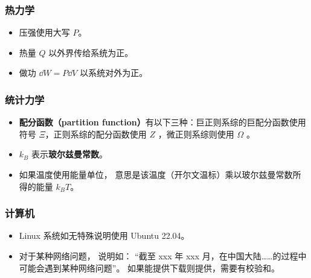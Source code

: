 \subsubsection{热力学}
\begin{itemize}
\item 压强使用大写 $P$。
\item 热量 $Q$ 以外界传给系统为正。
\item 做功 $\dd{W} = P\dd{V}$ 以系统对外为正。
\end{itemize}

\subsubsection{统计力学}
\begin{itemize}
\item \textbf{配分函数（partition function）}有以下三种：巨正则系综的巨配分函数使用符号 $\Xi$，正则系综的配分函数使用 $Z$ ，微正则系综则使用 $\Omega$ 。
\item $k_B$ 表示\textbf{玻尔兹曼常数}。%
\item 如果温度使用能量单位， 意思是该温度（开尔文温标）乘以玻尔兹曼常数所得的能量 $k_B T$。
\end{itemize}

\subsubsection{计算机}
\begin{itemize}
\item Linux 系统如无特殊说明使用 Ubuntu 22.04。
\item 对于某种网络问题， 说明如： “截至 xxx 年 xxx 月，在中国大陆……的过程中可能会遇到某种网络问题”。 如果能提供下载则提供，需要有校验和。
\end{itemize}
